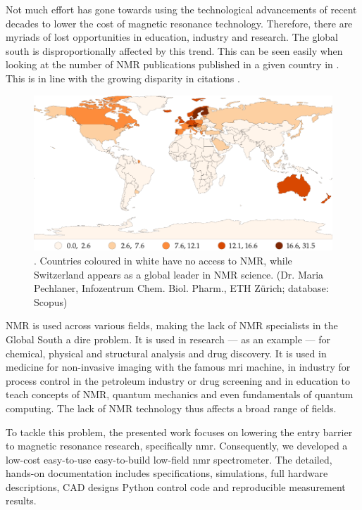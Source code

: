 Not much effort has gone towards using the technological advancements of recent decades to lower the cost of magnetic resonance technology. Therefore, there are myriads of lost opportunities in education, industry and research. The global south is disproportionally affected by this trend. This can be seen easily when looking at the number of NMR publications published in a given country in . This is in line with the growing disparity in citations .
\begin{figure}[h!bt]
    \centering
    \includegraphics{data/nmr_citations/nmr-affiliations-per-million-people_naturalbreaks.pdf}
    \caption{. Countries coloured in white have no access to NMR, while Switzerland appears as a global leader in NMR science. (Dr. Maria Pechlaner, Infozentrum Chem. Biol. Pharm., ETH Zürich; database: Scopus)}
\end{figure}

NMR is used across various fields, making the lack of NMR specialists in the Global South a dire problem. It is used in research --- as an example --- for chemical, physical and structural analysis and drug discovery. It is used in medicine for non-invasive imaging with the famous \acrshort{mri} machine, in industry for process control in the petroleum industry or drug screening and in education to teach concepts of NMR, quantum mechanics and even fundamentals of quantum computing. The lack of NMR technology thus affects a broad range of fields.

To tackle this problem, the presented work focuses on lowering the entry barrier to magnetic resonance research, specifically \acrfull{nmr}. Consequently, we developed a low-cost easy-to-use easy-to-build low-field \acrshort{nmr} spectrometer. The detailed, hands-on documentation includes specifications, simulations, full hardware descriptions, CAD designs Python control code and reproducible measurement results.

